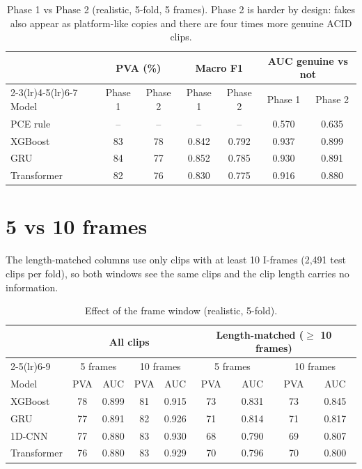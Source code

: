 \documentclass[11pt,a4paper]{article}
\begin{document}
\begin{table}[H]\centering\small\caption{Phase 1 vs Phase 2 (realistic, 5-fold, 5 frames). Phase 2 is harder by design: fakes also appear as platform-like copies and there are four times more genuine ACID clips.}\begin{tabular}{lcccccc}\toprule & \multicolumn{2}{c}{PVA (\%)} & \multicolumn{2}{c}{Macro F1} & \multicolumn{2}{c}{AUC genuine vs not} \\\cmidrule(lr){2-3}\cmidrule(lr){4-5}\cmidrule(lr){6-7} Model & Phase 1 & Phase 2 & Phase 1 & Phase 2 & Phase 1 & Phase 2 \\\midrule
PCE rule & -- & -- & -- & -- & 0.570 & 0.635 \\
XGBoost & 83 & 78 & 0.842 & 0.792 & 0.937 & 0.899 \\
GRU & 84 & 77 & 0.852 & 0.785 & 0.930 & 0.891 \\
Transformer & 82 & 76 & 0.830 & 0.775 & 0.916 & 0.880 \\
\bottomrule\end{tabular}\end{table}
\section{5 vs 10 frames}
The length-matched columns use only clips with at least 10 I-frames (2,491 test clips per fold), so both windows see the same clips and the clip length carries no information.
\begin{table}[H]\centering\small\caption{Effect of the frame window (realistic, 5-fold).}\label{tab:window}\begin{tabular}{lcccccccc}\toprule & \multicolumn{4}{c}{All clips} & \multicolumn{4}{c}{Length-matched ($\geq$ 10 frames)} \\\cmidrule(lr){2-5}\cmidrule(lr){6-9} & \multicolumn{2}{c}{5 frames} & \multicolumn{2}{c}{10 frames} & \multicolumn{2}{c}{5 frames} & \multicolumn{2}{c}{10 frames} \\Model & PVA & AUC & PVA & AUC & PVA & AUC & PVA & AUC \\\midrule
XGBoost & 78 & 0.899 & 81 & 0.915 & 73 & 0.831 & 73 & 0.845 \\
GRU & 77 & 0.891 & 82 & 0.926 & 71 & 0.814 & 71 & 0.817 \\
1D-CNN & 77 & 0.880 & 83 & 0.930 & 68 & 0.790 & 69 & 0.807 \\
Transformer & 76 & 0.880 & 83 & 0.929 & 70 & 0.796 & 70 & 0.800 \\
\bottomrule\end{tabular}\end{table}
\end{document}
